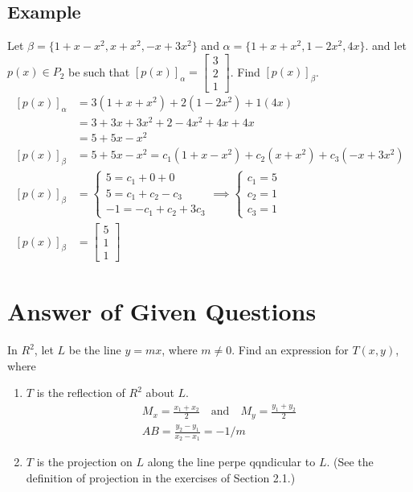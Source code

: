 \documentclass[10pt, oneside]{article}
\begin{document}
\subsection{Example}
Let $\beta = \{1+ x - x^2, x + x^2, -x + 3x^2\}$ and $\alpha = \{1 + x + x^2, 1 - 2x^2, 4x\}$. and
let $p(x) \in P_2$ be such that $[p(x)]_{\alpha} = \begin{bmatrix} 3 \\ 2 \\ 1 \end{bmatrix}$. Find
$[p(x)]_{\beta}$.
\[
	\begin{split}
		[p(x)]_{\alpha} &= 3(1 + x + x^2) + 2(1 - 2x^2) + 1(4x) \\
		&= 3 + 3x + 3x^2 + 2 - 4x^2 + 4x + 4x \\
		&= 5 + 5x - x^2 \\
		[p(x)]_{\beta} &= 5 + 5x - x^2 = c_1(1 + x - x^2) + c_2(x + x^2) + c_3(-x + 3x^2) \\
		[p(x)]_{\beta} &= \begin{cases}
			5 = c_1 + 0 + 0     \\
			5 = c_1 + c_2 - c_3 \\
			-1 = -c_1 + c_2 + 3c_3
		\end{cases}  \implies \begin{cases}
			c_1 = 5 \\
			c_2 = 1 \\
			c_3 = 1
		\end{cases} \\
		[p(x)]_{\beta} &= \begin{bmatrix} 5 \\ 1 \\ 1 \end{bmatrix}
	\end{split}
\]
\section{Answer of Given Questions}

In $R^2$, let $L$ be the line $y = mx$, where $m \neq 0$. Find an expression for $T(x, y)$, where
\begin{enumerate}
	\item $T$ is the reflection of $R^2$ about $L$.
	      \[
		      \begin{split}
			      M_x = \frac{x_1 + x_2}{2} \quad \text{and} \quad M_y = \frac{y_1 + y_2}{2} \\
			      AB = \frac{y_2 - y_1}{x_2 - x_1} = -1/m
		      \end{split}
	      \]
	\item $T$ is the projection on $L$ along the line perpe qqndicular to $L$. (See the definition of projection in the exercises of Section 2.1.)
\end{enumerate}
\end{document}

